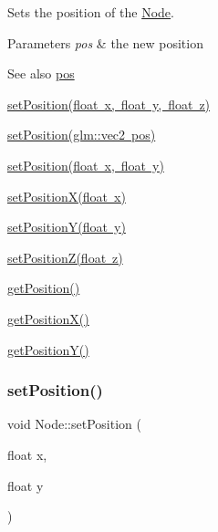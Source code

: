 Sets the position of the \mbox{\hyperlink{classsage_1_1Node}{Node}}. 


\begin{DoxyParams}{Parameters}
{\em pos} & the new position \\
\hline
\end{DoxyParams}
\begin{DoxySeeAlso}{See also}
\mbox{\hyperlink{classsage_1_1Node_a26c32e5ec11e0ed7f33053ecac6830d5}{pos}} 

\mbox{\hyperlink{classsage_1_1Node_ad9899110e543c6b16997512e47c142c9}{set\+Position(float x, float y, float z)}} 

\mbox{\hyperlink{classsage_1_1Node_ae2731cefe38e706c2bf21afae6da18b3}{set\+Position(glm\+::vec2 pos)}} 

\mbox{\hyperlink{classsage_1_1Node_aaa8545c103ef1b35e5076dbedab93af5}{set\+Position(float x, float y)}} 

\mbox{\hyperlink{classsage_1_1Node_ae1dfc73d6122a95778d5d9db3d1fd913}{set\+Position\+X(float x)}} 

\mbox{\hyperlink{classsage_1_1Node_a5c97d36655f0daa71a5f6c715d2b0470}{set\+Position\+Y(float y)}} 

\mbox{\hyperlink{classsage_1_1Node_a0dd2e816d50418b9b63a78fdf166ba53}{set\+Position\+Z(float z)}} 

\mbox{\hyperlink{classsage_1_1Node_a11fbdf2a2dcdf8bdc014df65f3003925}{get\+Position()}} 

\mbox{\hyperlink{classsage_1_1Node_a17e92da5beaeb4b299c4e93729a22b1a}{get\+Position\+X()}} 

\mbox{\hyperlink{classsage_1_1Node_a26337a40b7da400233451b71e85759cc}{get\+Position\+Y()}} 
\end{DoxySeeAlso}
\mbox{\label{classsage_1_1Node_aaa8545c103ef1b35e5076dbedab93af5}} 
\subsubsection{\texorpdfstring{setPosition()}{setPosition()}\hspace{0.1cm}{\footnotesize\ttfamily [3/4]}}
{\footnotesize\ttfamily void Node\+::set\+Position (\begin{DoxyParamCaption}\item[{float}]{x,  }\item[{float}]{y }\end{DoxyParamCaption})}



